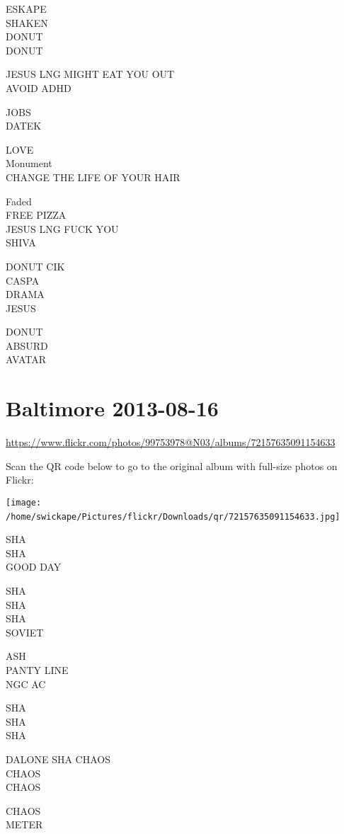 \documentclass[10pt,letterpaper]{article}
\begin{document}
ESKAPE\\
SHAKEN\\
DONUT\\
DONUT

JESUS LNG MIGHT EAT YOU OUT\\
AVOID ADHD

JOBS\\
DATEK

LOVE\\
Monument\\
CHANGE THE LIFE OF YOUR HAIR

Faded\\
FREE PIZZA\\
JESUS LNG FUCK YOU\\
SHIVA

DONUT CIK\\
CASPA\\
DRAMA\\
JESUS

DONUT\\
ABSURD\\
AVATAR
\

\section*{Baltimore 2013-08-16}

\url{https://www.flickr.com/photos/99753978@N03/albums/72157635091154633}

Scan the QR code below to go to the original album with full-size photos on Flickr:

\texttt{[image: /home/swickape/Pictures/flickr/Downloads/qr/72157635091154633.jpg]}
\

SHA\\
SHA\\
GOOD DAY

SHA\\
SHA\\
SHA\\
SOVIET

ASH\\
PANTY LINE\\
NGC AC

SHA\\
SHA\\
SHA

DALONE SHA CHAOS\\
CHAOS\\
CHAOS

CHAOS\\
METER
\end{document}

